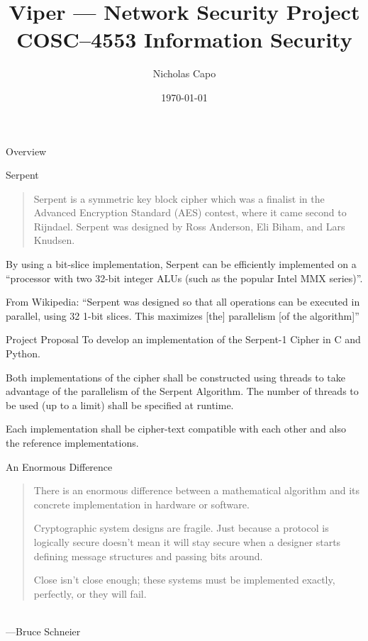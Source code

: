 \documentclass[style=sailor]{powerdot}
\title{Viper --- Network Security Project\\ \large{COSC--4553 Information Security}}
\author{Nicholas Capo}
\date{\today}
\begin{document}
\maketitle

\begin{slide}[toc=]{Overview}
\tableofcontents[type=1]
\end{slide}

\begin{slide}{Serpent}
\blockquote{Serpent is a symmetric key block cipher which was a finalist in the Advanced Encryption Standard (AES) contest, where it came second to Rijndael. Serpent was designed by Ross Anderson, Eli Biham, and Lars Knudsen.}\cite{wikipedia}\pause
\medskip

By using a bit-slice implementation, Serpent can be efficiently implemented on a \enquote{processor with two 32-bit integer ALUs (such as the popular Intel MMX series)}.\cite[2]{submission}\pause
\medskip

From Wikipedia: \enquote{Serpent was designed so that all operations can be executed in parallel, using 32 1-bit slices. This maximizes [the] parallelism [of the algorithm]}\cite{wikipedia}
\end{slide}

\begin{slide}{Project Proposal}
To develop an implementation of the Serpent-1 Cipher \cite{wikipedia}\cite{homepage} in C and Python.\pause
\medskip

Both implementations of the cipher shall be constructed using threads to take advantage of the parallelism of the Serpent Algorithm. The number of threads to be used (up to a limit) shall be specified at runtime. \pause
\medskip

Each implementation shall be cipher-text compatible with each other and also the reference implementations.  \cite{referenceImplementation}
\end{slide}

\begin{slide}[toc=]{An Enormous Difference}
\pause
\blockquote{There is an enormous difference between a mathematical algorithm and its concrete implementation in hardware or software.\pause
\medskip

Cryptographic system designs are fragile. Just because a protocol is logically secure doesn't mean it will stay secure when a designer starts defining message structures and passing bits around.\pause
\medskip

Close isn't close enough; these systems must be implemented exactly, perfectly, or they will fail.} \\---Bruce Schneier \cite{Schneier:Harder}
\end{slide}
\end{document}
